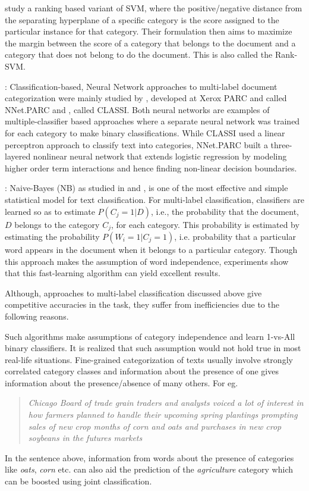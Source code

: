 \cite{elisseeff2001kernel} study a ranking based variant of SVM, where the positive/negative distance from the separating hyperplane of a specific category is the score assigned to the particular instance for that category. Their formulation then aims to maximize the margin between the score of a category that belongs to the document and a category that does not belong to do the document. This is also called the Rank-SVM.

 : Classification-based, Neural Network approaches to multi-label document categorization were mainly studied by \cite{wiener1995neural}, developed at Xerox PARC and called NNet.PARC and \cite{ng1997feature}, called CLASSI. Both neural networks are examples of multiple-classifier based approaches where a separate neural network was trained for each category to make binary classifications. While CLASSI used a linear perceptron approach to classify text into categories, NNet.PARC built a three-layered nonlinear neural network that extends logistic regression by modeling higher order term interactions and hence finding non-linear decision boundaries. 

 : Naive-Bayes (NB) as studied in \cite{lewis1992representation} and \cite{lewis1994comparison}, is one of the most effective and simple statistical model for text classification. For multi-label classification, classifiers are learned so as to estimate $P(C_{j}=1|D)$, i.e., the probability that the document, $D$ belongs to the category $C_{j}$, for each category. This probability is estimated by estimating the probability $P(W_{i}=1|C_{j}=1)$, i.e. probability that a particular word appears in the document when it belongs to a particular category. Though this approach makes the assumption of word independence, experiments show that this fast-learning algorithm can yield excellent results. 

\hfill 
\break
Although, approaches to multi-label classification discussed above give competitive accuracies in the task, they suffer from inefficiencies due to the following reasons.

Such algorithms make assumptions of category independence and learn 1-vs-All binary classifiers. It is realized that such assumption would not hold true in most real-life situations. Fine-grained categorization of texts usually involve strongly correlated category classes and information about the presence of one gives information about the presence/absence of many others. For eg.  
\begin{quote} 
\centering 
\emph{Chicago Board of trade grain traders and analysts voiced a lot of interest in how farmers planned to handle their upcoming spring plantings prompting sales of new crop months of corn and oats and purchases in new crop soybeans in the futures markets}
\end{quote}
In the sentence above, information from words about the presence of categories like \emph{oats}, \emph{corn} etc. can also aid the prediction of the \emph{agriculture} category which can be boosted using joint classification.

